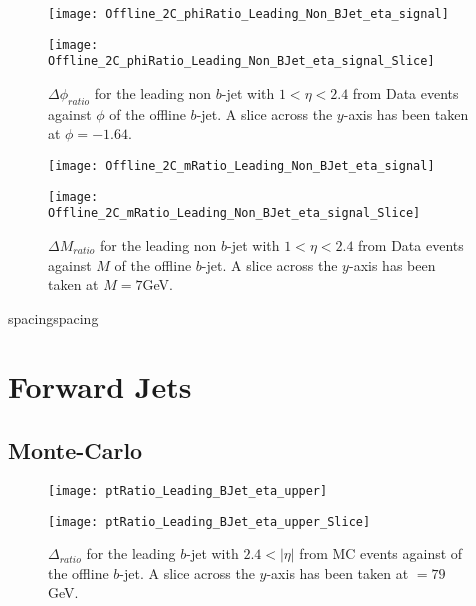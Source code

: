		\begin{figure}[h]
			\centering
			
			\begin{minipage}[h]{0.33\linewidth}
				\texttt{[image: Offline\_2C\_phiRatio\_Leading\_Non\_BJet\_eta\_signal]}
			\end{minipage}
			\quad
			\begin{minipage}[h]{0.33\linewidth}
				\texttt{[image: Offline\_2C\_phiRatio\_Leading\_Non\_BJet\_eta\_signal\_Slice]}
			\end{minipage}
			\caption{$\Delta \phi_{ratio}$ for the leading \pt non $b$-jet with $1 < \eta < 2.4$\textbf{} from Data events against $\phi$ of the offline $b$-jet. A slice across the $y$-axis has been taken at $\phi=-1.64$. }
			\label{fig:D:leadingnonbphicore}
		\end{figure}
		
		\begin{figure}[h]
			\centering
			
			\begin{minipage}[h]{0.33\linewidth}
				\texttt{[image: Offline\_2C\_mRatio\_Leading\_Non\_BJet\_eta\_signal]}
			\end{minipage}
			\quad
			\begin{minipage}[h]{0.33\linewidth}
				\texttt{[image: Offline\_2C\_mRatio\_Leading\_Non\_BJet\_eta\_signal\_Slice]}
			\end{minipage}
			\caption{$\Delta M_{ratio}$ for the leading \pt non $b$-jet with $1 < \eta < 2.4$ from Data events against $M$ of the offline $b$-jet. A slice across the $y$-axis has been taken at $M=7$GeV. }
			\label{fig:D:leadingnonbmcore}
		\end{figure}
		
		

\newpage spacing\newpage spacing \newpage
\section{Forward  Jets}

		\subsection{Monte-Carlo}

		\begin{figure}[h]
			\centering
			\begin{minipage}[h]{0.33\linewidth}
				\texttt{[image: ptRatio\_Leading\_BJet\_eta\_upper]}

			\end{minipage}
			\quad
			\begin{minipage}[h]{0.33\linewidth}
				\texttt{[image: ptRatio\_Leading\_BJet\_eta\_upper\_Slice]}
			\end{minipage}
			\caption{$\Delta $\pt$_{ratio}$ for the leading \pt $b$-jet with $2.4 < |\eta|$ from MC events against \pt of the offline $b$-jet. A slice across the $y$-axis has been taken at \pt$=79$GeV. }
			\label{fig:MC:leadingbptforward}
		\end{figure}

